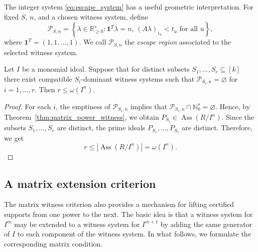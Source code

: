 \documentclass[11pt]{amsart}   %
\begin{document}
The integer system \eqref{eq:escape_system} has a useful geometric
interpretation. For fixed $S$, $n$, and a chosen witness system, define
\[
\mathcal P_{S,n}
=
\left\{
\lambda\in\mathbb R_{\geq0}^s:
\mathbf 1^T\lambda=n,\,
(A\lambda)_{i_u}<t_u
\text{ for all }u
\right\},
\]
where 
$\mathbf{1}^T= (1,1,\ldots,1).$
We call $\mathcal P_{S,n}$ the
\emph{escape region} associated to the selected witness system. 

\begin{cor}
\label{cor:empty_escape_omega}
Let $I$ be a monomial ideal. Suppose that for distinct subsets
$S_1,\ldots,S_r\subseteq[k]$ there exist compatible
$S_i$-dominant witness systems such that $\mathcal P_{S_i,n}=\varnothing$ for $i=1,\ldots,r.$ Then
 $r\leq \omega(I^n).$
\end{cor}

\begin{proof}
For each $i$, the emptiness of $\mathcal P_{S_i,n}$ implies that $\mathcal P_{S_i,n}\cap\mathbb N_0^s=\varnothing.$
Hence, by Theorem~\ref{thm:matrix_power_witness}, we obtain $P_{S_i}\in\operatorname{Ass}(R/I^n).$
 Since the subsets $S_1,\ldots,S_r$ are distinct, the prime ideals
$P_{S_1},\ldots,P_{S_r}$ are distinct. Therefore, we get
\[
r\leq
|\operatorname{Ass}(R/I^n)|
=
\omega(I^n).
\]
\end{proof}







\subsection{A matrix extension criterion}

\label{sec:matrix_extension}

The matrix witness criterion also provides a mechanism for lifting
certified supports from one power to the next.  The basic idea is that
a witness system for $I^m$ may be extended to a witness system for
$I^{m+1}$ by adding the same generator of $I$ to each component of the
witness system. In what follows, we  formulate the corresponding matrix condition.
\end{document}
